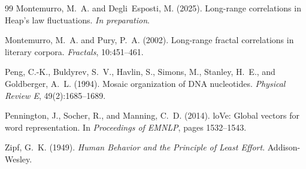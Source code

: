 \documentclass[preprint]{elsarticle}
\begin{document}
\begin{thebibliography}{99}
Montemurro, M.~A. and Degli~Esposti, M. (2025).
\newblock Long-range correlations in {H}eap's law fluctuations.
\newblock \emph{In preparation}.

Montemurro, M.~A. and Pury, P.~A. (2002).
\newblock Long-range fractal correlations in literary corpora.
\newblock \emph{Fractals}, 10:451--461.

Peng, C.-K., Buldyrev, S.~V., Havlin, S., Simons, M., Stanley,
  H.~E., and Goldberger, A.~L. (1994).
\newblock Mosaic organization of {DNA} nucleotides.
\newblock \emph{Physical Review E}, 49(2):1685--1689.

Pennington, J., Socher, R., and Manning, C.~D. (2014).
lo{V}e: Global vectors for word representation.
\newblock In \emph{Proceedings of EMNLP}, pages 1532--1543.

Zipf, G.~K. (1949).
\newblock \emph{Human Behavior and the Principle of Least Effort}.
\newblock Addison-Wesley.

\end{thebibliography}
\end{document}
